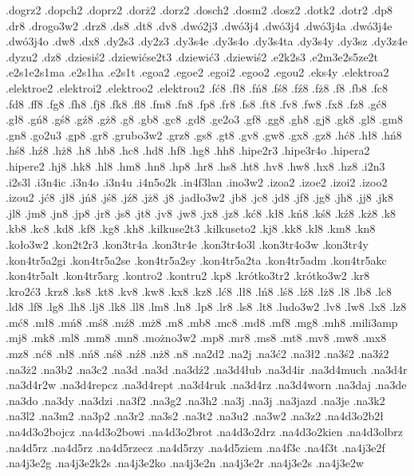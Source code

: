 {.dogrz2
.dopch2
.doprz2
.dor\.z2
.dorz2
.dosch2
.dosm2
.dosz2
.dotk2
.dotr2
.dp8
.dr8
.drogo3w2
.drz8
.ds8
.dt8
.dv8
.dw\'o2j3
.dw\'o3j4\ka
.dw\'o3j4\ke
.dw\'o3j4a
.dw\'o3j4e
.dw\'o3j4o
.dw8
.dx8
.dy2s3
.dy2z3
.dy3s4e
.dy3s4o
.dy3s4ta
.dy3s4y
.dy3sz
.dy3z4e
.dyzu2
.dz8
.dziesi\'s2
.dziewi\ke\'cse2t3
.dziewi\'c3
.dziewi\'s2
.e2k2s3
.e2m3e2s5ze2t
.e2s1e2s1ma
.e2s1ha
.e2s1t
.egoa2
.egoe2
.egoi2
.egoo2
.egou2
.eks4y
.elektroa2
.elektroe2
.elektroi2
.elektroo2
.elektrou2
.f\'c8
.f\l 8
.f\'n8
.f\'s8
.f\'z8
.f\.z8
.f8
.fb8
.fc8
.fd8
.ff8
.fg8
.fh8
.fj8
.fk8
.fl8
.fm8
.fn8
.fp8
.fr8
.fs8
.ft8
.fv8
.fw8
.fx8
.fz8
.g\'c8
.g\l 8
.g\'n8
.g\'s8
.g\'z8
.g\.z8
.g8
.gb8
.gc8
.gd8
.ge2o3
.gf8
.gg8
.gh8
.gj8
.gk8
.gl8
.gm8
.gn8
.go2u3
.gp8
.gr8
.grubo3w2
.grz8
.gs8
.gt8
.gv8
.gw8
.gx8
.gz8
.h\'c8
.h\l 8
.h\'n8
.h\'s8
.h\'z8
.h\.z8
.h8
.hb8
.hc8
.hd8
.hf8
.hg8
.hh8
.hipe2r3
.hipe3r4o
.hipera2
.hipere2
.hj8
.hk8
.hl8
.hm8
.hn8
.hp8
.hr8
.hs8
.ht8
.hv8
.hw8
.hx8
.hz8
.i2n3
.i2s3l
.i3n4ic
.i3n4o
.i3n4u
.i4n5o2k
.in4f3lan
.ino3w2
.izoa2
.izoe2
.izoi2
.izoo2
.izou2
.j\'c8
.j\l 8
.j\'n8
.j\'s8
.j\'z8
.j\.z8
.j8
.jad\l o3w2
.jb8
.jc8
.jd8
.jf8
.jg8
.jh8
.jj8
.jk8
.jl8
.jm8
.jn8
.jp8
.jr8
.js8
.jt8
.jv8
.jw8
.jx8
.jz8
.k\'c8
.k\l 8
.k\'n8
.k\'s8
.k\'z8
.k\.z8
.k8
.kb8
.kc8
.kd8
.kf8
.kg8
.kh8
.kilkuse2t3
.kilkuseto2
.kj8
.kk8
.kl8
.km8
.kn8
.ko\l o3w2
.kon2t2r3
.kon3tr4a
.kon3tr4e
.kon3tr4o3l
.kon3tr4o3w
.kon3tr4y
.kon4tr5a2gi
.kon4tr5a2se
.kon4tr5a2sy
.kon4tr5a2ta
.kon4tr5adm
.kon4tr5akc
.kon4tr5alt
.kon4tr5arg
.kontro2
.kontru2
.kp8
.kr\'otko3tr2
.kr\'otko3w2
.kr8
.kro2\'c3
.krz8
.ks8
.kt8
.kv8
.kw8
.kx8
.kz8
.l\'c8
.l\l 8
.l\'n8
.l\'s8
.l\'z8
.l\.z8
.l8
.lb8
.lc8
.ld8
.lf8
.lg8
.lh8
.lj8
.lk8
.ll8
.lm8
.ln8
.lp8
.lr8
.ls8
.lt8
.ludo3w2
.lv8
.lw8
.lx8
.lz8
.m\'c8
.m\l 8
.m\'n8
.m\'s8
.m\'z8
.m\.z8
.m8
.mb8
.mc8
.md8
.mf8
.mg8
.mh8
.mili3amp
.mj8
.mk8
.ml8
.mm8
.mn8
.mo\.zno3w2
.mp8
.mr8
.ms8
.mt8
.mv8
.mw8
.mx8
.mz8
.n\'c8
.n\l 8
.n\'n8
.n\'s8
.n\'z8
.n\.z8
.n8
.na2d2
.na2j
.na3\'c2
.na3\l 2
.na3\'s2
.na3\'z2
.na3\.z2
.na3b2
.na3c2
.na3d\ka
.na3d\ke
.na3d\'z2
.na3d4\l ub
.na3d4ir
.na3d4much
.na3d4r\kecz
.na3d4r2w
.na3d4repcz
.na3d4rept
.na3d4ruk
.na3d4rz
.na3d4worn
.na3daj
.na3de
.na3do
.na3dy
.na3dzi
.na3f2
.na3g2
.na3h2
.na3j\ka
.na3j\ke
.na3jazd
.na3je
.na3k2
.na3l2
.na3m2
.na3p2
.na3r2
.na3s2
.na3t2
.na3u2
.na3w2
.na3z2
.na4d3o2b2\l 
.na4d3o2bojcz
.na4d3o2bowi
.na4d3o2brot
.na4d3o2drz
.na4d3o2kien
.na4d3olbrz
.na4d5rz\ka
.na4d5rz\ke
.na4d5rzecz
.na4d5rzy
.na4d5ziem
.na4f3c
.na4f3t
.na4j3e2f
.na4j3e2g
.na4j3e2k2s
.na4j3e2ko
.na4j3e2n
.na4j3e2r
.na4j3e2s
.na4j3e2w
}
